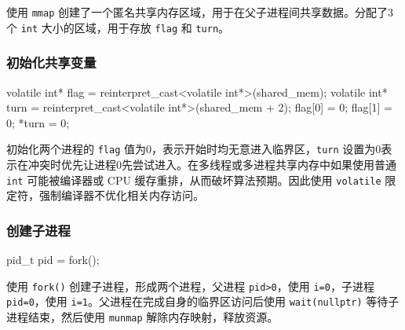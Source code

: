 使用 \texttt{mmap} 创建了一个匿名共享内存区域，用于在父子进程间共享数据。分配了3个 \texttt{int} 大小的区域，用于存放 \texttt{flag} 和 \texttt{turn}。

\subsubsection{初始化共享变量}
\begin{cppcode}
volatile int* flag = reinterpret_cast<volatile int*>(shared_mem);
volatile int* turn = reinterpret_cast<volatile int*>(shared_mem + 2);
flag[0] = 0;
flag[1] = 0;
*turn = 0;
\end{cppcode}
初始化两个进程的 \texttt{flag} 值为0，表示开始时均无意进入临界区，\texttt{turn} 设置为0表示在冲突时优先让进程0先尝试进入。在多线程或多进程共享内存中如果使用普通 \texttt{int} 可能被编译器或 CPU 缓存重排，从而破坏算法预期。因此使用 \texttt{volatile} 限定符，强制编译器不优化相关内存访问。

\subsubsection{创建子进程}
\begin{cppcode}
pid_t pid = fork();
\end{cppcode}
使用 \texttt{fork()} 创建子进程，形成两个进程，父进程 \texttt{pid>0}，使用 \texttt{i=0}，子进程 \texttt{pid=0}，使用 \texttt{i=1}。父进程在完成自身的临界区访问后使用 \texttt{wait(nullptr)} 等待子进程结束，然后使用 \texttt{munmap} 解除内存映射，释放资源。

